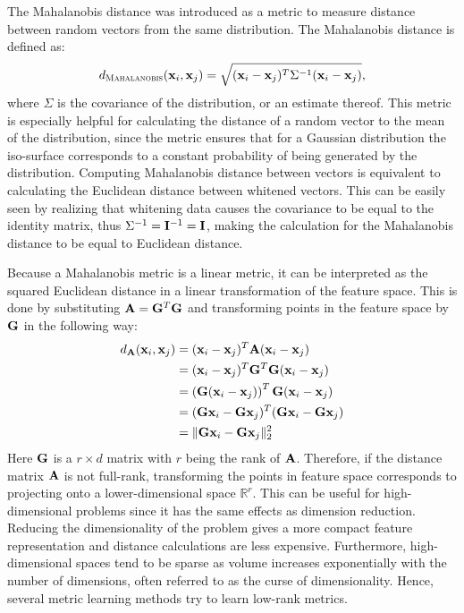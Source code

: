 \begin{textbox}
The Mahalanobis distance was introduced as a metric to measure distance between random vectors from the same distribution. \cite{mahalanobis1936generalised} The Mahalanobis distance is defined as:
\begin{equation}
d_{\textsc{Mahalanobis}}(\vec{x}_i, \vec{x}_j) = \sqrt{(\vec{x}_i - \vec{x}_j)^T\Sigma^{-1}(\vec{x}_i - \vec{x}_j)},
\end{equation}
where $\Sigma$ is the covariance of the distribution, or an estimate thereof. This metric is especially helpful for calculating the distance of a random vector to the mean of the distribution, since the metric ensures that for a Gaussian distribution the iso-surface corresponds to a constant probability of being generated by the distribution. Computing Mahalanobis distance between vectors is equivalent to calculating the Euclidean distance between whitened vectors. This can be easily seen by realizing that whitening data causes the covariance to be equal to the identity matrix, thus $\Sigma^{-1} = \mat{I}^{-1} = \mat{I}$, making the calculation for the Mahalanobis distance to be equal to Euclidean distance.
\caption{}
\label{tb:mahalanobis}
\end{textbox}

Because a Mahalanobis metric is a linear metric, it can be interpreted as the squared Euclidean distance in a linear transformation of the feature space. This is done by substituting $\mat{A} = \mat{G}^T\mat{G}$ and transforming points in the feature space by $\mat{G}$ in the following way:
\begin{align}
d_{\mat{A}}(\vec{x}_i, \vec{x}_j) & = (\vec{x}_i - \vec{x}_j)^T\mat{A}(\vec{x}_i - \vec{x}_j) \nonumber \\
& = (\vec{x}_i - \vec{x}_j)^T\mat{G}^T\mat{G}(\vec{x}_i - \vec{x}_j) \nonumber \\
& = \left(\mat{G}(\vec{x}_i - \vec{x}_j)\right)^T \mat{G}(\vec{x}_i - \vec{x}_j) \nonumber \\
& = (\mat{G}\vec{x}_i - \mat{G}\vec{x}_j)^T(\mat{G}\vec{x}_i - \mat{G}\vec{x}_j) \nonumber \\
& = \|\mat{G}\vec{x}_i - \mat{G}\vec{x}_j\|_2^2
\end{align}
Here $\mat{G}$ is a $r \times d$ matrix with $r$ being the rank of $\mat{A}$. Therefore, if the distance matrix $\mat{A}$ is not full-rank, transforming the points in feature space corresponds to projecting onto a lower-dimensional space $\mathbb{R}^r$. This can be useful for high-dimensional problems since it has the same effects as dimension reduction. Reducing the dimensionality of the problem gives a more compact feature representation and distance calculations are less expensive. Furthermore, high-dimensional spaces tend to be sparse as volume increases exponentially with the number of dimensions, often referred to as the curse of dimensionality. Hence, several metric learning methods try to learn low-rank metrics.

